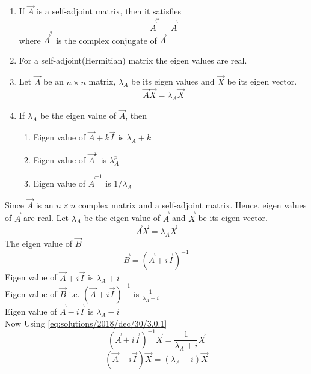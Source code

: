 \begin{enumerate}
\item If $\vec{A}$ is a self-adjoint matrix, then it satisfies 
\begin{equation}\label{eq:solutions/2018/dec/30/2.0.1}
\vec{A}^{*} = \vec{A}
\end{equation}
where $\vec{A}^{*}$ is the complex conjugate of $\vec{A}$
\item For a self-adjoint(Hermitian) matrix the eigen values are real.
\item Let $\vec{A}$ be an $n \times n$ matrix, $\lambda_A$ be its eigen values and $\vec{X}$ be its eigen vector.
\begin{equation}\label{eq:solutions/2018/dec/30/2.0.2}
\vec{A}\vec{X} = \lambda_A \vec{X} 
\end{equation}
\item If $\lambda_A$ be the eigen value of $\vec{A}$, then 
\begin{enumerate}
 \item Eigen value of $\vec{A}+k\vec{I}$ is $\lambda_A+k$
 \item Eigen value of $\vec{A}^p$ is $\lambda_A^p$
 \item Eigen value of $\vec{A}^{-1}$ is $1/\lambda_A$
\end{enumerate}
\end{enumerate}
Since $\vec{A}$ is an $n \times n$ complex matrix and a self-adjoint matrix. Hence, eigen values of $\vec{A}$ are real.
Let $\lambda_A$ be the eigen value of $\vec{A}$ and $\vec{X}$ be its eigen vector.
\begin{equation}\label{eq:solutions/2018/dec/30/3.0.1}
\vec{A}\vec{X} = \lambda_A \vec{X} 
\end{equation}
The eigen value of $\vec{B}$
\begin{equation*}
\vec{B} = (\vec{A}+i\vec{I})^{-1}
\end{equation*}
 Eigen value of $\vec{A}+i\vec{I}$ is $\lambda_A+i$\\
 Eigen value of $\vec{B}$ i.e. $(\vec{A}+i\vec{I})^{-1}$ is $\frac{1}{\lambda_A+i}$\\
 Eigen value of $\vec{A}-i\vec{I}$ is $\lambda_A-i$\\
 Now Using \eqref{eq:solutions/2018/dec/30/3.0.1}
 \begin{equation}\label{eq:solutions/2018/dec/30/3.0.2}
 (\vec{A}+i\vec{I})^{-1} \vec{X} = \frac{1}{\lambda_A+i} \vec{X}
 \end{equation}
 \begin{equation}\label{eq:solutions/2018/dec/30/3.0.3}
 (\vec{A}-i\vec{I}) \vec{X} = (\lambda_A-i) \vec{X}
 \end{equation}
